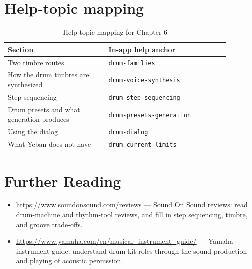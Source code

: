 \section{Help-topic mapping}

\begin{table}[htbp]
\centering
\small
\begin{tabular}{@{}p{0.40\linewidth}p{0.48\linewidth}@{}}
\hline
Section & In-app help anchor \\
\hline
Two timbre routes & \texttt{drum-families} \\
How the drum timbres are synthesized & \texttt{drum-voice-synthesis} \\
Step sequencing & \texttt{drum-step-sequencing} \\
Drum presets and what generation produces & \texttt{drum-presets-generation} \\
Using the dialog & \texttt{drum-dialog} \\
What Yeban does not have & \texttt{drum-current-limits} \\
\hline
\end{tabular}
\caption{Help-topic mapping for Chapter 6}
\end{table}

\section*{Further Reading}
\begin{itemize}[leftmargin=1.5em]
\item \url{https://www.soundonsound.com/reviews} — Sound On Sound reviews: read drum-machine and rhythm-tool reviews, and fill in step sequencing, timbre, and groove trade-offs.
\item \url{https://www.yamaha.com/en/musical_instrument_guide/} — Yamaha instrument guide: understand drum-kit roles through the sound production and playing of acoustic percussion.
\end{itemize}
